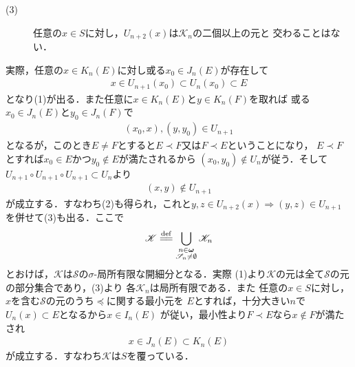 \begin{prf}
\begin{description}
\begin{description}
					\item[(3)] 任意の$x \in S$に対し，$U_{n+2}(x)$は$\mathscr{K}_n$の二個以上の元と
						交わることはない．
				\end{description}
				実際，任意の$x \in K_n(E)$に対し或る$x_0 \in J_n(E)$が存在して
				\begin{align}
					x \in U_{n+1}(x_0) \subset U_n(x_0) \subset E
				\end{align}
				となり(1)が出る．また任意に$x \in K_n(E)$と$y \in K_n(F)$を取れば
				或る$x_0 \in J_n(E)$と$y_0 \in J_n(F)$で
				\begin{align}
					(x_0,x),(y,y_0) \in U_{n+1}
				\end{align}
				となるが，このとき$E \neq F$とすると$E \prec F$又は$F \prec E$ということになり，
				$E \prec F$とすれば$x_0 \in E$かつ$y_0 \notin E$が満たされるから
				$(x_0,y_0) \notin U_n$が従う．そして$U_{n+1} \circ U_{n+1} \circ U_{n+1} \subset U_n$より
				\begin{align}
					(x,y) \notin U_{n+1}
				\end{align}
				が成立する．すなわち(2)も得られ，これと$y,z \in U_{n+2}(x) \Longrightarrow (y,z) \in U_{n+1}$
				を併せて(3)も出る．ここで
				\begin{align}
					\mathscr{K} \defeq 
					\bigcup_{\substack{n \in \Natural \\ \mathscr{S}_n \neq \emptyset}} \mathscr{K}_n
				\end{align}
				とおけば，$\mathscr{K}$は$\mathscr{S}$の$\sigma$-局所有限な開細分となる．実際
				(1)より$\mathscr{K}$の元は全て$\mathscr{S}$の元の部分集合であり，(3)より
				各$\mathscr{K}_n$は局所有限である．また
				任意の$x \in S$に対し，$x$を含む$\mathscr{S}$の元のうち$\preceq$に関する最小元を
				$E$とすれば，十分大きい$n$で$U_n(x) \subset E$となるから$x \in I_n(E)$
				が従い，最小性より$F \prec E$なら$x \notin F$が満たされ
				\begin{align}
					x \in J_n(E) \subset K_n(E)
				\end{align}
				が成立する．すなわち$\mathscr{K}$は$S$を覆っている．
				

\end{description}
\end{prf}
